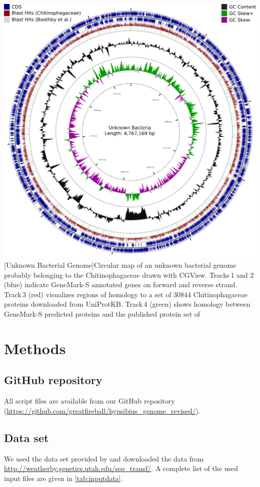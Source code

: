 \documentclass[12pt,a4paper]{scrartcl}
\begin{document}
\includegraphics[width=1\textwidth]{supplementary_figure_3}
[Unknown Bacterial Genome]{Circular map of an
  unknown bacterial genome probably belonging to the Chitinophagaceae
  drawn with CGView. Tracks\,1 and 2\,(blue) indicate GeneMark-S annotated
  genes on forward and reverse strand. Track\,3 (red) visualizes
  regions of homology to a set of \num{30844} Chitinophagaceae proteins
  downloaded from UniProtKB. Track\,4 (green) shows homology between
  GeneMark-S predicted proteins and the published protein set of
  \textcite{Boothby2015}}

\pagebreak

\section{Methods}

\subsection*{GitHub repository}
All script files are available from our GitHub repository
(\url{https://github.com/greatfireball/hypsibius_genome_revised/}).

\subsection*{Data set}
We used the data set provided by \textcite{Boothby2015} and downloaded
the data from \url{http://weatherby.genetics.utah.edu/seq_transf/}. A
complete list of the used input files are given in
\cref{tab:inputdata}.
\end{document}
